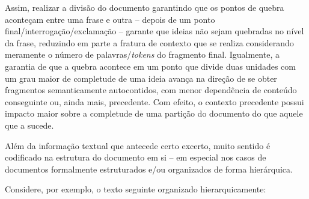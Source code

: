 Assim, realizar a divisão do documento garantindo que os pontos de quebra aconteçam entre uma frase e outra -- depois de um ponto final/interrogação/exclamação -- garante que ideias não sejam quebradas no nível da frase, reduzindo em parte a fratura de contexto que se realiza considerando meramente o número de palavras/\textit{tokens} do fragmento final. Igualmente, a garantia de que a quebra acontece em um ponto que divide duas unidades com um grau maior de completude de uma ideia avança na direção de se obter fragmentos semanticamente autocontidos, com menor dependência de conteúdo conseguinte ou, ainda mais, precedente. Com efeito, o contexto precedente possui impacto maior sobre a completude de uma partição do documento do que aquele que a sucede.

Além da informação textual que antecede certo excerto, muito sentido é codificado na estrutura do documento em si -- em especial nos casos de documentos formalmente estruturados e/ou organizados de forma hierárquica. 

Considere, por exemplo, o texto seguinte organizado hierarquicamente:

